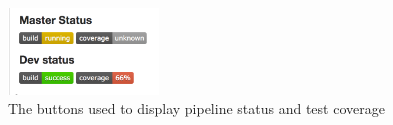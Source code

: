 \begin{figure}
\begin{center}
\includegraphics[width=4cm]{figures/cicd_coverage_buttons}
\end{center}
\caption{The buttons used to display pipeline status and test coverage}
\label{fig:cicd_coverage_buttons}
\end{figure}
